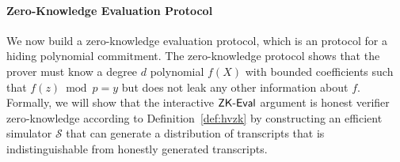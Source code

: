 \paragraph{Zero-Knowledge Evaluation Protocol}

We now build a zero-knowledge evaluation protocol, which is an \eval protocol for a hiding polynomial commitment. The zero-knowledge protocol shows that the prover must know a degree $d$ polynomial $f(X)$ with bounded coefficients such that $f(z)\bmod p = y$ but does not leak any other information about $f$. Formally, we will show that the interactive $\textsf{{ZK-Eval}}$ argument is honest verifier zero-knowledge according to Definition~\ref{def:hvzk} by constructing an efficient simulator $\mathcal{S}$ that can generate a distribution of transcripts that is indistinguishable from honestly generated transcripts.


